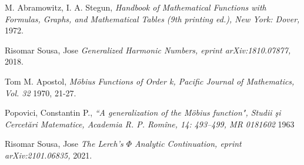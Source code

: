 \documentclass[12pt]{article}
\begin{document}
\begin{table}[h]
\begin{tabular}{|r|r|r|r|r|r|r|r|r|r|r|r|}
\end{tabular}
\end{table}


\newpage

\begin{thebibliography}{1}
 M. Abramowitz, I. A. Stegun, {\em Handbook of Mathematical Functions with Formulas, Graphs, and Mathematical Tables (9th printing ed.), New York: Dover,}  1972.

 Risomar Sousa, Jose {\em Generalized Harmonic Numbers, eprint arXiv:1810.07877,} 2018.

 Tom M. Apostol, {\em M\"{o}bius Functions of Order k, Pacific Journal of Mathematics, Vol. 32} 1970, 21-27.

 Popovici, Constantin P., {\em ``A generalization of the M\"{o}bius function", Studii şi Cercetări Matematice, Academia R. P. Romîne, 14: 493–499, MR 0181602} 1963 

 Risomar Sousa, Jose {\em The Lerch's $\Phi$ Analytic Continuation, eprint arXiv:2101.06835,} 2021.


\end{thebibliography}
\end{document}
